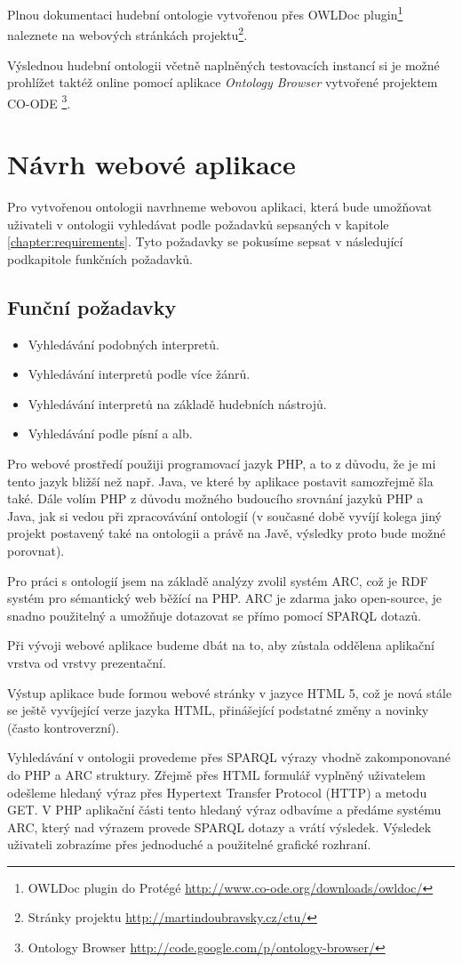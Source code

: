 Plnou dokumentaci hudební ontologie vytvořenou přes OWLDoc plugin\footnote{OWLDoc plugin do Protégé \url{http://www.co-ode.org/downloads/owldoc/}} naleznete na webových stránkách projektu\footnote{Stránky projektu \url{http://martindoubravsky.cz/ctu/}}.

Výslednou hudební ontologii včetně naplněných testovacích instancí si je možné prohlížet taktéž online pomocí aplikace \textit{Ontology Browser} vytvořené projektem CO-ODE \footnote{Ontology Browser \url{http://code.google.com/p/ontology-browser/}}.

\section{Návrh webové aplikace}
\label{chapter:webappdesign}

Pro vytvořenou ontologii navrhneme webovou aplikaci, která bude umožňovat uživateli v ontologii vyhledávat podle požadavků sepsaných v kapitole \ref{chapter:requirements}.
Tyto požadavky se pokusíme sepsat v následující podkapitole funkčních požadavků.

\subsection{Funční požadavky}
\label{chaper:funcrequirements}
\begin{itemize}
\item Vyhledávání podobných interpretů.
\item Vyhledávání interpretů podle více žánrů.
\item Vyhledávání interpretů na základě hudebních nástrojů.
\item Vyhledávání podle písní a alb.
\end{itemize}

Pro webové prostředí použiji programovací jazyk PHP, a to z důvodu, že je mi tento jazyk bližší než např. Java, ve které by aplikace postavit samozřejmě šla také.
Dále volím PHP z důvodu možného budoucího srovnání jazyků PHP a Java, jak si vedou při zpracovávání ontologií (v současné době vyvíjí kolega jiný projekt postavený také na ontologii a právě na Javě, výsledky proto bude možné porovnat).

Pro práci s ontologií jsem na základě analýzy zvolil systém ARC, což je RDF systém pro sémantický web běžící na PHP.
ARC je zdarma jako open-source, je snadno použitelný a umožňuje dotazovat se přímo pomocí SPARQL dotazů.

Při vývoji webové aplikace budeme dbát na to, aby zůstala oddělena aplikační vrstva od vrstvy prezentační. 

Výstup aplikace bude formou webové stránky v jazyce HTML 5, což je nová stále se ještě vyvíjející verze jazyka HTML, přinášející podstatné změny a novinky (často kontroverzní). 

Vyhledávání v ontologii provedeme přes SPARQL výrazy vhodně zakomponované do PHP a ARC struktury.
Zřejmě přes HTML formulář vyplněný uživatelem odešleme hledaný výraz přes Hypertext Transfer Protocol (HTTP) a metodu GET. V PHP aplikační části tento hledaný výraz odbavíme a předáme systému ARC, který nad výrazem provede SPARQL dotazy a vrátí výsledek.
Výsledek uživateli zobrazíme přes jednoduché a použitelné grafické rozhraní.